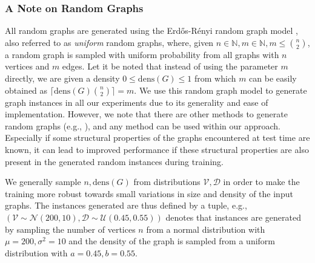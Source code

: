 \documentclass[draft,final]{vutinfth} %
\begin{document}
\subsubsection{A Note on Random Graphs}
All random graphs are generated using the Erd\H{o}s-Rényi random graph model \cite{erdos59a}, also referred to as \emph{uniform} random graphs, where, given $n \in \mathbb{N}, m \in \mathbb{N}, m \leq \binom{n}{2}$, a random graph is sampled with uniform probability from all graphs with $n$ vertices and $m$ edges. Let it be noted that instead of using the parameter $m$ directly, we are given a density $0 \leq \mathrm{dens}(G) \leq 1$ from which $m$ can be easily obtained as $\lceil \mathrm{dens}(G) \binom{n}{2} \rceil = m$. 
We use this random graph model to generate graph instances in all our experiments due to its generality and ease of implementation. 
However, we note that there are other methods to generate random graphs (e.g., \cite{Aiello2001}), and any method can be used within our approach. Especially if some structural properties of the graphs encountered at test time are known, it can lead to improved performance if these structural properties are also present in the generated random instances during training. 

We generally sample $n, \mathrm{dens}(G)$ from distributions $\mathcal{V}, \mathcal{D}$ in order to make the training more robust towards small variations in size and density of the input graphs. The instances generated are thus defined by a tuple, e.g., $(\mathcal{V} \sim \mathcal{N}(200, 10), \mathcal{D} \sim \mathcal{U}(0.45, 0.55))$ denotes that instances are generated by sampling the number of vertices $n$ from a normal distribution with $\mu=200, \sigma^2 = 10$ and the density of the graph is sampled from a uniform distribution with $a=0.45, b=0.55$.
\end{document}
